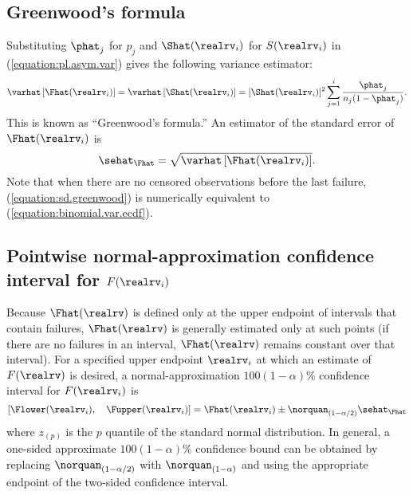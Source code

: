 \subsection{Greenwood's formula}
Substituting $\phat_{j}$ for $p_{j}$ and $\Shat(\realrv_{i})$ for
$S(\realrv_{i})$
in (\ref{equation:pl.asym.var})
gives the following variance estimator:
\begin{equation}
\label{equation:greenwood}
 \varhat \left [\Fhat(\realrv_{i}) 
\right ]=\varhat \left [\Shat(\realrv_{i}) \right ] =
 [\Shat(\realrv_{i})]^{2}
\sum_{j=1}^{i} \frac{\phat_{j}}{n_{j}(1-\phat_{j})}.
\end{equation}
This is known as ``Greenwood's formula.''
An estimator of the standard error of
$\Fhat(\realrv_{i})$
is
\begin{equation}
\label{equation:sd.greenwood}
\sehat_{\Fhat} =
\sqrt{\varhat \left [\Fhat(\realrv_{i}) \right ]}.
\end{equation} 
Note that when there are no censored observations before
the last failure, (\ref{equation:sd.greenwood}) is
numerically equivalent to (\ref{equation:binomial.var.ecdf}).

\subsection{Pointwise normal-approximation
confidence interval for $F(\realrv_{i}) $}
\label{section:np.pointwise.ci}
Because $\Fhat(\realrv)$ is defined only at the upper endpoint of
intervals that contain failures, $\Fhat(\realrv)$ is generally
estimated only at such points (if there are no failures in an
interval, $\Fhat(\realrv)$ remains constant over that interval).  For
a specified upper endpoint $\realrv_{i}$ at which an estimate of
$F(\realrv)$ is desired, a normal-approximation $100 (1-\alpha)\%$
confidence interval for $F(\realrv_{i})$ is
\begin{equation}
\label{equation:np.normal.theory.ci}
[\Flower(\realrv_{i}), \quad \Fupper(\realrv_{i})] =
\Fhat(\realrv_{i}) \pm \norquan_{(1-\alpha/2)} 
\sehat_{\Fhat}
\end{equation}
where $z_{(p)}$ is the $p$ quantile of the 
standard normal distribution.
In general, a one-sided approximate $100(1-\alpha)\%$
confidence bound can be obtained by replacing
$\norquan_{(1-\alpha/2)}$ with $\norquan_{(1-\alpha)}$ and using the
appropriate endpoint of the two-sided confidence interval.

